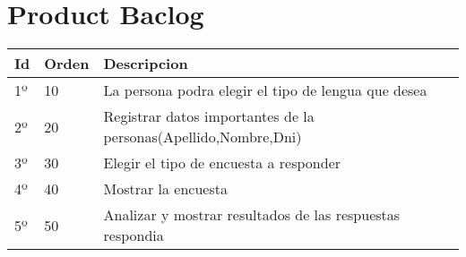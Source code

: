 \chapter{Product Baclog}



\begin{table}[htbp]
	\begin{center}
		\begin{tabular}{| p{3.2cm}| p{4.2cm} |p{6.8cm} |}
			\hline
			\textbf{Id} & \textbf {Orden} & \textbf{Descripcion} \\\hline    
			1º & 10 & La persona podra elegir el tipo de lengua que desea\\ \hline
			2º & 20 & Registrar datos importantes de la personas(Apellido,Nombre,Dni)\\ \hline
			3º & 30 & Elegir el tipo de encuesta a responder\\ \hline
			4º & 40 & Mostrar la encuesta\\ \hline
			5º & 50 & Analizar y mostrar resultados de las respuestas respondia\\ \hline
		\end{tabular}
	\end{center}
\end{table}
